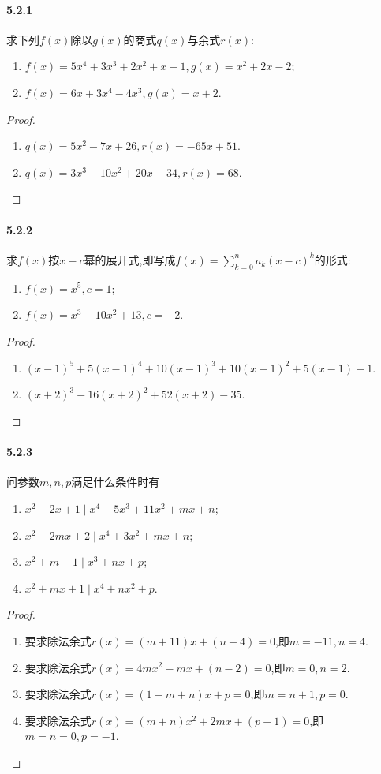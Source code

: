 \documentclass[11pt]{article}
\begin{document}
\paragraph{5.2.1}求下列$f(x)$除以$g(x)$的商式$q(x)$与余式$r(x)$:
\begin{enumerate}
    \item $f(x)=5x^4+3x^3+2x^2+x-1, g(x)=x^2+2x-2$;
    \item $f(x)=6x+3x^4-4x^3, g(x)=x+2$.
\end{enumerate}
\begin{proof}
    \begin{enumerate}
        \item $q(x)=5 x^2-7x+26, r(x)=-65x+51$.
        \item $q(x)=3 x^3-10  x^2+20  x-34, r(x)=68$.
    \end{enumerate}
\end{proof}
\paragraph{5.2.2}求$f(x)$按$x-c$幂的展开式,即写成$f(x)=\sum_{k=0}^n a_k (x-c)^k$的形式:
\begin{enumerate}
    \item $f(x)=x^5, c=1$;
    \item $f(x)=x^3-10x^2+13, c=-2$.
\end{enumerate}
\begin{proof}
    \begin{enumerate}
        \item $(x-1)^5+5(x-1)^4+10(x-1)^3+10(x-1)^2+5(x-1)+1$.
        \item $(x+2)^3-16(x+2)^2+52(x+2)-35$.
    \end{enumerate}
\end{proof}
\paragraph{5.2.3}问参数$m,n,p$满足什么条件时有
\begin{enumerate}
    \item $x^2-2x+1\mid x^4-5x^3+11x^2+mx+n$;
    \item $x^2-2mx+2\mid x^4+3x^2+mx+n$;
    \item $x^2+m-1\mid x^3+nx+p$;
    \item $x^2+mx+1\mid x^4+nx^2+p$.
\end{enumerate}
\begin{proof}
    \begin{enumerate}
        \item 要求除法余式$r(x)=(m+11)x+(n-4)=0$,即$m=-11, n=4$.
        \item 要求除法余式$r(x)=4mx^2-mx+(n-2)=0$,即$m=0, n=2$.
        \item 要求除法余式$r(x)=(1-m+n)x+p=0$,即$m=n+1, p=0$.
        \item 要求除法余式$r(x)=(m+n)x^2+2mx+(p+1)=0$,即$m=n=0, p=-1$.
    \end{enumerate}
\end{proof}
\end{document}
